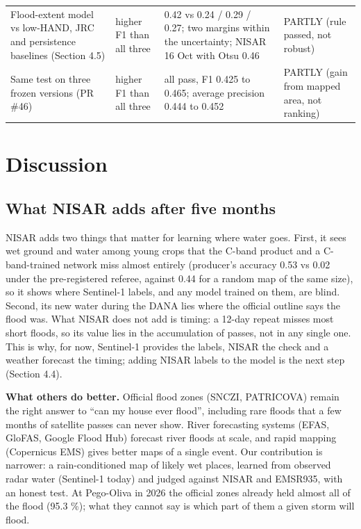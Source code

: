 \documentclass[10pt,twocolumn]{article}
\begin{document}
\begin{table}[tbp]
\begin{tabularx}{\textwidth}{LLLL}
{}Flood-extent model vs low-HAND, JRC and persistence baselines (Section 4.5) & higher F1 than all three & 0.42 vs 0.24 / 0.29 / 0.27; two margins within the uncertainty; NISAR 16 Oct with Otsu 0.46 & PARTLY (rule passed, not robust) \\
{}Same test on three frozen versions (PR \#46) & higher F1 than all three & all pass, F1 0.425 to 0.465; average precision 0.444 to 0.452 & PARTLY (gain from mapped area, not ranking) \\
\bottomrule
\end{tabularx}
\end{table}

\section{Discussion}
\subsection{What NISAR adds after five months}
NISAR adds two things that matter for learning where water goes. First, it sees wet ground and water among young crops that the C-band product and a C-band-trained network miss almost entirely (producer's accuracy 0.53 vs 0.02 under the pre-registered referee, against 0.44 for a random map of the same size), so it shows where Sentinel-1 labels, and any model trained on them, are blind. Second, its new water during the DANA lies where the official outline says the flood was. What NISAR does not add is timing: a 12-day repeat misses most short floods, so its value lies in the accumulation of passes, not in any single one. This is why, for now, Sentinel-1 provides the labels, NISAR the check and a weather forecast the timing; adding NISAR labels to the model is the next step (Section 4.4).

\textbf{What others do better.} Official flood zones (SNCZI, PATRICOVA) remain the right answer to ``can my house ever flood'', including rare floods that a few months of satellite passes can never show. River forecasting systems (EFAS, GloFAS, Google Flood Hub) forecast river floods at scale, and rapid mapping (Copernicus EMS) gives better maps of a single event. Our contribution is narrower: a rain-conditioned map of likely wet places, learned from observed radar water (Sentinel-1 today) and judged against NISAR and EMSR935, with an honest test. At Pego-Oliva in 2026 the official zones already held almost all of the flood (95.3 \%); what they cannot say is which part of them a given storm will flood.
\end{document}
